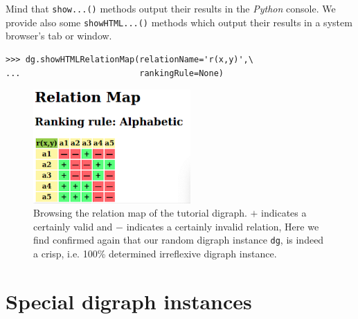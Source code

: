 Mind that \texttt{show...()} methods output their results in the \emph{Python} console. We provide also some \texttt{showHTML...()} methods which output their results in a system browser’s tab or window.
\begin{lstlisting}
>>> dg.showHTMLRelationMap(relationName='r(x,y)',\
...                        rankingRule=None)
\end{lstlisting}
\begin{figure}[h]
\sidecaption[t]
\includegraphics[width=6cm]{Figures/relationMap1.png}
\caption{Browsing the relation map of the tutorial digraph. $+$ indicates a certainly valid and $-$ indicates a certainly  invalid relation, Here we find confirmed again that our random digraph instance \texttt{dg}, is indeed a crisp, i.e. 100\% determined irreflexive digraph instance.}
\label{fig:1.2}       %
\end{figure}

\section{Special digraph instances}
\label{sec:1.5}

